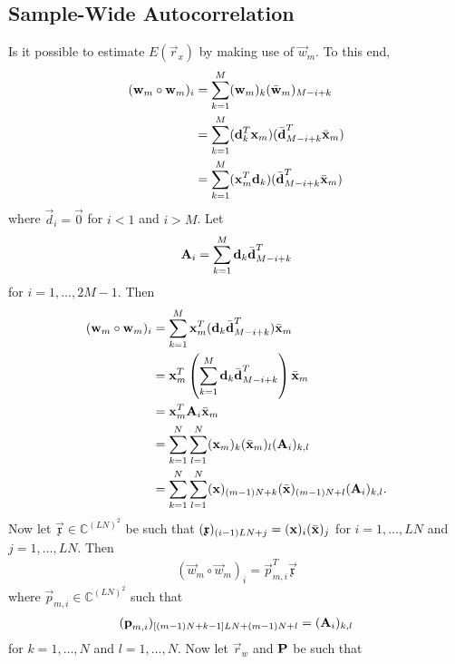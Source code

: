 \documentclass[a4paper, openany, oneside]{memoir}
\begin{document}
\subsection{Sample-Wide Autocorrelation}
Is it possible to estimate $E(\vec{r}_x)$ by making use of $\vec{w}_m$. To this end,
\begin{align*}
    (\boldsymbol{\mathbf{w}}_m \circ \boldsymbol{\mathbf{w}}_m)_i &= \sum_{k=1}^M (\boldsymbol{\mathbf{w}}_m)_k (\bar{\boldsymbol{\mathbf{w}}}_m)_{M-i+k} \\
    &= \sum_{k=1}^M (\boldsymbol{\mathbf{d}}_k^T \boldsymbol{\mathbf{x}}_m)(\bar{\boldsymbol{\mathbf{d}}}_{M-i+k}^T \bar{\boldsymbol{\mathbf{x}}}_m) \\
    &= \sum_{k=1}^M (\boldsymbol{\mathbf{x}}_m^T \boldsymbol{\mathbf{d}}_k)(\bar{\boldsymbol{\mathbf{d}}}_{M-i+k}^T \bar{\boldsymbol{\mathbf{x}}}_m)
\end{align*}
where $\vec{d}_i = \vec{0}$ for $i < 1$ and $i > M$. Let
\begin{align*}
     \boldsymbol{\mathbf{A}}_i = \sum_{k=1}^M  \boldsymbol{\mathbf{d}}_k \bar{\boldsymbol{\mathbf{d}}}_{M-i+k}^T
\end{align*}
for $i = 1,\ldots,2M-1$. Then
\begin{align*}
    (\boldsymbol{\mathbf{w}}_m \circ \boldsymbol{\mathbf{w}}_m)_i &= \sum_{k=1}^M \boldsymbol{\mathbf{x}}_m^T (\boldsymbol{\mathbf{d}}_k \bar{\boldsymbol{\mathbf{d}}}_{M-i+k}^T) \bar{\boldsymbol{\mathbf{x}}}_m \\
    &= \boldsymbol{\mathbf{x}}_m^T\left(\sum_{k=1}^M  \boldsymbol{\mathbf{d}}_k \bar{\boldsymbol{\mathbf{d}}}_{M-i+k}^T\right) \bar{\boldsymbol{\mathbf{x}}}_m \\
    &= \boldsymbol{\mathbf{x}}_m^T \boldsymbol{\mathbf{A}}_i \bar{\boldsymbol{\mathbf{x}}}_m \\
    &= \sum_{k = 1}^N \sum_{l=1}^N (\boldsymbol{\mathbf{x}}_m)_k (\bar{\boldsymbol{\mathbf{x}}}_m)_l (\boldsymbol{\mathbf{A}}_i)_{k,l} \\
    &= \sum_{k = 1}^N \sum_{l=1}^N (\boldsymbol{\mathbf{x}})_{(m-1)N+k} (\bar{\boldsymbol{\mathbf{x}}})_{(m-1)N+l} (\boldsymbol{\mathbf{A}}_i)_{k,l}.
\end{align*}
Now let $\vec{\mathfrak{x}} \in \mathbb{C}^{(LN)^2}$ be such that $(\boldsymbol{\mathbf{\mathfrak{x}}})_{(i-1)LN+j} = (\boldsymbol{\mathbf{x}})_i (\bar{\boldsymbol{\mathbf{x}}})_j$ for $i = 1,\ldots,LN$ and $j = 1,\ldots,LN$. Then
\begin{align*}
    (\vec{w}_m \circ \vec{w}_m)_i = \vec{p}_{m,i}^T \vec{\mathfrak{x}}
\end{align*}
where $\vec{p}_{m,i} \in \mathbb{C}^{(LN)^2}$ such that
\begin{align*}
    (\boldsymbol{\mathbf{p}}_{m,i})_{[(m-1)N+k-1]LN+(m-1)N+l} = (\boldsymbol{\mathbf{A}}_i)_{k,l}
\end{align*}
for $k = 1,\ldots,N$ and $l = 1,\ldots,N$. Now let $\vec{r}_w$ and $\boldsymbol{\mathbf{P}}$ be such that
\end{document}
